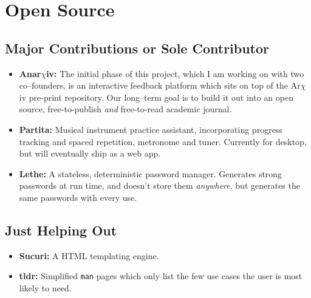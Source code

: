 \documentclass[11pt,a4paper,sans]{moderncv}        %
\begin{document}
\section{Open Source}
\vspace{5pt}
\small{
\subsection{Major Contributions or Sole Contributor}
\begin{itemize}
\item \textbf{Anar$\chi$iv: } The initial phase of this project, which I am working on with two co--founders, is an interactive feedback platform which sits on top of the Ar$\chi$iv pre-print repository. Our long--term goal is to build it out into an open source, free-to-publish \textit{and} free-to-read academic journal.
\item \textbf{Partita: } Musical instrument practice assistant, incorporating progress tracking and spaced repetition, metronome and tuner. Currently for desktop, but will eventually ship as a web app.
\item \textbf{Lethe: } A stateless, deterministic password manager. Generates strong passwords at run time, and doesn't store them \textit{anywhere}, but generates the same passwords with every use.
\end{itemize}

\vspace{5pt}
\subsection{Just Helping Out}
\vspace{5pt}
\begin{itemize}
\item \textbf{Sucuri: } A HTML templating engine.
\item \textbf{tldr: } Simplified \verb|man| pages which only list the few use cases the user is most likely to need.
\end{itemize}
}
\end{document}
